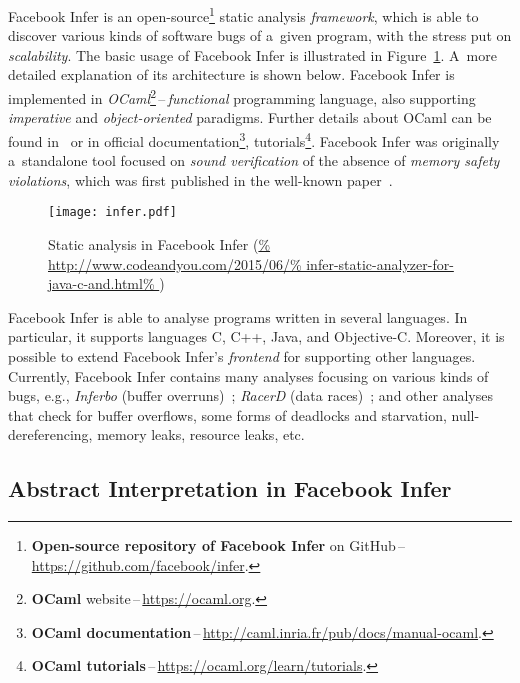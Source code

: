 Facebook Infer is an open-source\footnote{\textbf{Open-source repository of
Facebook Infer} on GitHub\,--\,\url{https://github.com/facebook/infer}.}
static analysis \emph{framework}, which is able to discover various kinds of
software bugs of a~given program, with the stress put on \emph{scalability}.
The basic usage of Facebook Infer is illustrated in Figure~\ref{fig:infer}.
A~more detailed explanation of its architecture is shown below. Facebook 
Infer is implemented in \emph{OCaml}\footnote{\textbf{OCaml}
website\,--\,\url{https://ocaml.org}.}\,--\,\emph{functional} programming
language, also supporting \emph{imperative} and \emph{object-oriented}
paradigms. Further details about OCaml can be found in~\cite{realWorldOCaml}
or in official documentation\footnote{\textbf{OCaml
documentation}\,--\,\url{http://caml.inria.fr/pub/docs/manual-ocaml}.},
tutorials\footnote{\textbf{OCaml
tutorials}\,--\,\url{https://ocaml.org/learn/tutorials}.}. Facebook Infer was
originally a~standalone tool focused on \emph{sound verification} of the 
absence of \emph{memory safety violations}, which was first published in
the well-known paper~\cite{inferBiabduction}.

\begin{figure}[hbt]
    \centering
    \texttt{[image: infer.pdf]}
    \caption{%
        Static analysis in Facebook Infer
        (\url{%
            http://www.codeandyou.com/2015/06/%
            infer-static-analyzer-for-java-c-and.html%
        })
    }
    \label{fig:infer}
\end{figure}

Facebook Infer is able to analyse programs written in several languages.
In particular, it supports languages C, C++, Java, and Objective-C. Moreover,
it is possible to extend Facebook Infer's \emph{frontend} for supporting
other languages. Currently, Facebook Infer contains many analyses focusing
on various kinds of bugs, e.g., \emph{Inferbo} (buffer
overruns)~\cite{inferboOnline}; \emph{RacerD} (data races)~\cite{racerD,
racerDOnline, staticRaceDetectorTruePositive}; and other analyses
that check for buffer overflows, some forms of deadlocks and starvation,
null-dereferencing, memory leaks, resource leaks, etc.


\subsection{Abstract Interpretation in Facebook Infer}
\label{sec:fbinferAI}

